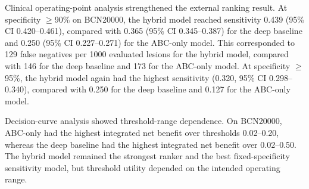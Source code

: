 \documentclass[preprint,12pt]{elsarticle}
\begin{document}
Clinical operating-point analysis strengthened the external ranking result. At specificity $\geq$90\% on BCN20000, the hybrid model reached sensitivity 0.439 (95\% CI 0.420--0.461), compared with 0.365 (95\% CI 0.345--0.387) for the deep baseline and 0.250 (95\% CI 0.227--0.271) for the ABC-only model. This corresponded to 129 false negatives per 1000 evaluated lesions for the hybrid model, compared with 146 for the deep baseline and 173 for the ABC-only model. At specificity $\geq$95\%, the hybrid model again had the highest sensitivity (0.320, 95\% CI 0.298--0.340), compared with 0.250 for the deep baseline and 0.127 for the ABC-only model.

\begin{table}[htbp]
\centering
\caption{BCN20000 clinical operating points at fixed specificity.}
\label{tab:bcn_clinical_operating_points}
\end{table}

Decision-curve analysis showed threshold-range dependence. On BCN20000, ABC-only had the highest integrated net benefit over thresholds 0.02--0.20, whereas the deep baseline had the highest integrated net benefit over 0.02--0.50. The hybrid model remained the strongest ranker and the best fixed-specificity sensitivity model, but threshold utility depended on the intended operating range.
\end{document}
